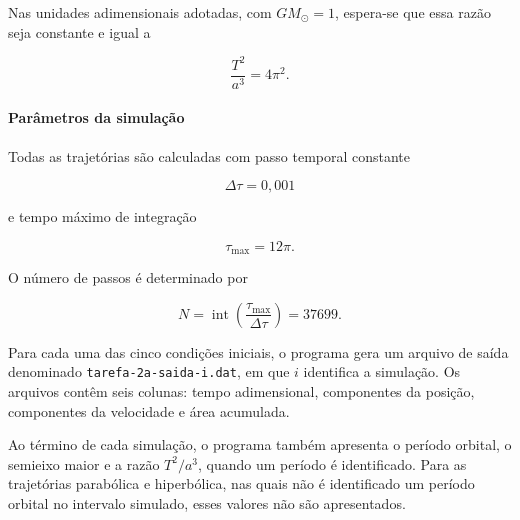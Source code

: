 \documentclass[12pt,a4paper]{article}
\begin{document}
Nas unidades adimensionais adotadas, com $GM_{\odot}=1$, espera-se que essa razão seja constante e igual a

\begin{equation}
    \frac{T^2}{a^3}=4\pi^2.
\end{equation}

\paragraph{Parâmetros da simulação}

Todas as trajetórias são calculadas com passo temporal constante

\begin{equation}
    \Delta\tau=0,001
\end{equation}

e tempo máximo de integração

\begin{equation}
    \tau_{\max}=12\pi.
\end{equation}

O número de passos é determinado por

\begin{equation}
    N=\operatorname{int}
    \left(\frac{\tau_{\max}}{\Delta\tau}\right)
    =37699.
\end{equation}

Para cada uma das cinco condições iniciais, o programa gera um arquivo de saída denominado \texttt{tarefa-2a-saida-i.dat}, em que $i$ identifica a simulação. Os arquivos contêm seis colunas: tempo adimensional, componentes da posição, componentes da velocidade e área acumulada.

Ao término de cada simulação, o programa também apresenta o período orbital, o semieixo maior e a razão $T^2/a^3$, quando um período é identificado. Para as trajetórias parabólica e hiperbólica, nas quais não é identificado um período orbital no intervalo simulado, esses valores não são apresentados.
\end{document}
